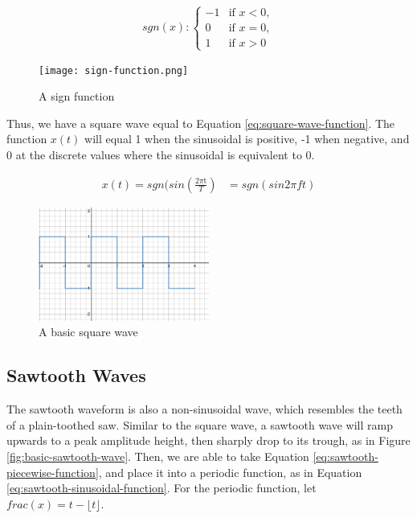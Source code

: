 \begin{equation}
	sgn (x): \begin{cases}
		-1 & \textrm{if } x < 0, \\
		0 & \textrm{if } x = 0, \\
		1 & \textrm{if } x > 0
	\end{cases}
	\label{eq:sgn-function}
\end{equation}

\begin{figure}
  \centering
  \texttt{[image: sign-function.png]}
  \caption{A sign function}
  \label{fig:sign-function}
\end{figure}

Thus, we have a square wave equal to Equation \ref{eq:square-wave-function}. The function $x(t)$ will equal 1 when the sinusoidal is positive, -1 when negative, and 0 at the discrete values where the sinusoidal is equivalent to 0.

\begin{align}
	x(t) = sgn(sin(\frac{2\pi\textrm{t}}{T}) &
	= sgn(sin2\pi ft)
	\label{eq:square-wave-function}
\end{align} %


\begin{figure}
  \centering
  \includegraphics[width=0.5\textwidth]{figures/square-wave.png}
  \caption{A basic square wave}
  \label{fig:square-wave}
\end{figure}

\subsection{Sawtooth Waves}
The sawtooth waveform is also a non-sinusoidal wave, which resembles the teeth of a plain-toothed saw. Similar to the square wave, a sawtooth wave will ramp upwards to a peak amplitude height, then sharply drop to its trough, as in Figure \ref{fig:basic-sawtooth-wave}. Then, we are able to take Equation \ref{eq:sawtooth-piecewise-function}, and place it into a periodic function, as in Equation \ref{eq:sawtooth-sinusoidal-function}. For the periodic function, let $frac(x) = t - \lfloor t \rfloor$.


